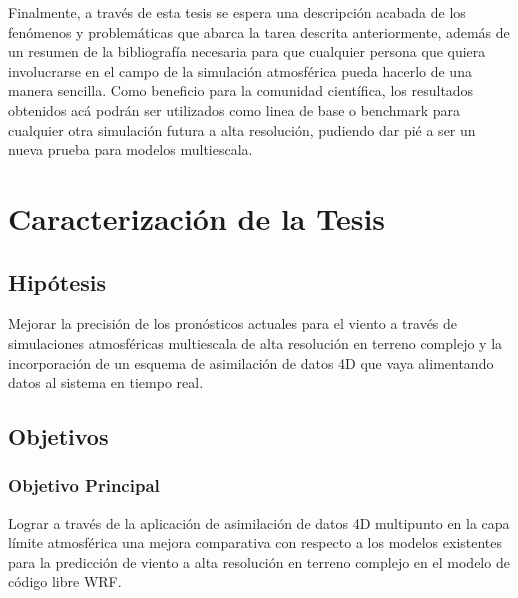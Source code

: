 Finalmente, a través de esta tesis se espera una descripción acabada de los fenómenos y problemáticas que abarca la tarea descrita anteriormente, además de un resumen de la bibliografía necesaria para que cualquier persona que quiera involucrarse en el campo de la simulación atmosférica pueda hacerlo de una manera sencilla. Como beneficio para la comunidad científica, los resultados obtenidos acá podrán ser utilizados como linea de base o benchmark para cualquier otra simulación futura a alta resolución, pudiendo dar pié a ser un nueva prueba para modelos multiescala.

\section{Caracterización de la Tesis}
\subsection{Hipótesis}

Mejorar la precisión de los pronósticos actuales para el viento a través de simulaciones atmosféricas multiescala de alta resolución en terreno complejo y la incorporación de un esquema de asimilación de datos 4D que vaya alimentando datos al sistema en tiempo real.

\subsection{Objetivos}
\subsubsection{Objetivo Principal}
\begin{itemize*}
	\item Lograr a través de la aplicación de asimilación de datos 4D multipunto en la capa límite atmosférica una mejora comparativa con respecto a los modelos existentes para la predicción de viento a alta resolución en terreno complejo en el modelo de código libre WRF.
\end{itemize*}
